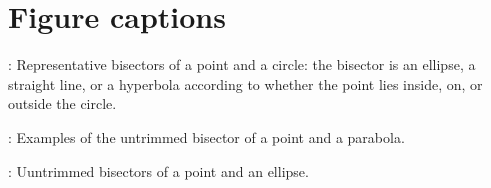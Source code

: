 \section*{Figure captions}

\bigskip
{}:
Representative bisectors of a point and a circle: the bisector is
an ellipse, a straight line, or a hyperbola according to whether the
point lies inside, on, or outside the circle.

\medskip
{}:
Examples of the untrimmed bisector of a point and a parabola.

\medskip
{}:
Uuntrimmed bisectors of a point and an ellipse.









